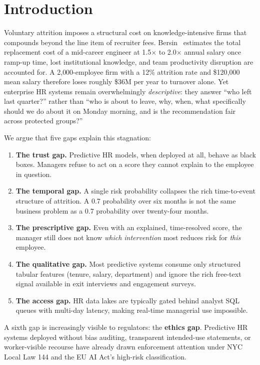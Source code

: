 \documentclass[conference]{IEEEtran}
\begin{document}
\section{Introduction}
Voluntary attrition imposes a structural cost on knowledge-intensive
firms that compounds beyond the line item of recruiter fees.
Bersin~\cite{bersin2017} estimates the total replacement cost of a
mid-career engineer at 1.5$\times$ to 2.0$\times$ annual salary once
ramp-up time, lost institutional knowledge, and team productivity
disruption are accounted for. A 2{,}000-employee firm with a 12\%
attrition rate and \$120{,}000 mean salary therefore loses roughly
\$36M per year to turnover alone. Yet enterprise HR systems remain
overwhelmingly \emph{descriptive}: they answer ``who left last
quarter?'' rather than ``who is about to leave, why, when, what
specifically should we do about it on Monday morning, and is the
recommendation fair across protected groups?''

We argue that five gaps explain this stagnation:

\begin{enumerate}
\item \textbf{The trust gap.} Predictive HR models, when deployed at
all, behave as black boxes. Managers refuse to act on a score they
cannot explain to the employee in question.
\item \textbf{The temporal gap.} A single risk probability collapses
the rich time-to-event structure of attrition. A 0.7 probability over
six months is not the same business problem as a 0.7 probability over
twenty-four months.
\item \textbf{The prescriptive gap.} Even with an explained,
time-resolved score, the manager still does not know
\emph{which intervention} most reduces risk for \emph{this} employee.
\item \textbf{The qualitative gap.} Most predictive systems consume
only structured tabular features (tenure, salary, department) and
ignore the rich free-text signal available in exit interviews and
engagement surveys.
\item \textbf{The access gap.} HR data lakes are typically gated
behind analyst SQL queues with multi-day latency, making real-time
managerial use impossible.
\end{enumerate}

A sixth gap is increasingly visible to regulators: the \textbf{ethics
gap}. Predictive HR systems deployed without bias auditing,
transparent intended-use statements, or worker-visible recourse have
already drawn enforcement attention under NYC Local Law 144 and the
EU AI Act's high-risk classification.
\end{document}
